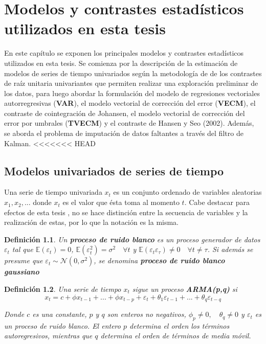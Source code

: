 \documentclass[12pt, twoside]{book}\usepackage[]{graphicx}\usepackage[]{color}
\numberwithin{equation}{section}
\numberwithin{theorem}{section}
\numberwithin{teorema}{section}
\newtheorem{defi}{Definición}
\newenvironment{defin}
      {\begin{shaded}\begin{defi}}
      {\end{defi}\end{shaded}}
\numberwithin{defi}{section}
\numberwithin{prop}{section}
\numberwithin{defi}{section}
\theoremstyle{plain}
\begin{document}
\chapter{Modelos y contrastes estadísticos utilizados en esta tesis}

En este capítulo se exponen los principales modelos y contrastes estadísticos utilizados en esta tesis. Se comienza por la descripción de la estimación de modelos de series de tiempo univariados según la metodología de de los contrastes de raíz unitaria univariantes que permiten realizar una exploración preliminar de los datos, para luego abordar la formulación del modelo de regresiones vectoriales autorregresivas (\textbf{VAR}), el modelo vectorial de corrección del error (\textbf{VECM}), el contraste de cointegración de Johansen, el modelo vectorial de corrección del error por umbrales (\textbf{TVECM}) y el contraste de Hansen y Seo (2002). Además, se aborda el problema de imputación de datos faltantes a través del filtro de Kalman. 
<<<<<<< HEAD

\section{Modelos univariados de series de tiempo}

Una serie de tiempo univariada $x_{t}$ es un conjunto ordenado de variables aleatorias $x_{1},x_{2},...$ donde $x_{t}$ es el valor que ésta toma al momento $t$. Cabe destacar para efectos de esta tesis , no se hace distinción entre la secuencia de variables y la realización de estas, por lo que la notación es la misma. 

\begin{defin}
Un \textbf{proceso de ruido blanco} es un proceso generador de datos $\varepsilon_{t}$ tal que $\mathbb{E}(\varepsilon_{t})=0$, $\mathbb{E}(\varepsilon_{t}^{2})=\sigma^{2}\quad \forall t$ y $\mathbb{E}(\varepsilon_{t}\varepsilon_{\tau})\neq 0\quad \forall t\neq \tau$. Si además se presume que $\varepsilon_{t}\sim \mathcal{N}(0,\sigma^{2})$, se denomina \textbf{proceso de ruido blanco gaussiano}
\end{defin}

\begin{defin}
Una serie de tiempo $x_{t}$ sigue un proceso \textbf{ARMA(p,q)} si 
\begin{equation}
x_{t}  = c +\phi x_{t-1}+...+\phi x_{t-p}+\varepsilon_{t}+\theta_{1}\varepsilon_{t-1}+...+\theta_{q}\varepsilon_{t-q}
\end{equation}

Donde $c$ es una constante, $p$ y $q$ son enteros no negativos, $\phi_{p}\neq 0,\quad \theta_{q}\neq 0$ y $\varepsilon_{t}$ es un proceso de ruido blanco. El entero $p$ determina el orden los términos autoregresivos, mientras que $q$ determina el orden de términos de media móvil.   

\end{defin}
\end{document}
